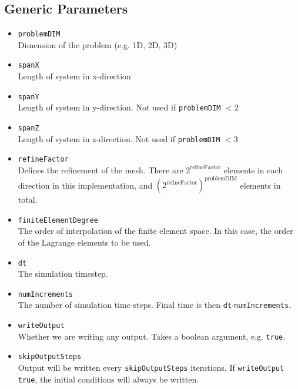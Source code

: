 \documentclass[11pt]{article}
\begin{document}
\subsection{Generic Parameters}
\begin{itemize}
\item \texttt{problemDIM} \\
	Dimension of the problem (e.g. 1D, 2D, 3D)
\item \texttt{spanX} \\
	Length of system in x-direction
\item \texttt{spanY} \\
	Length of system in y-direction.  Not used if \texttt{problemDIM} $< 2$
\item \texttt{spanZ} \\
	Length of system in z-direction.  Not used if \texttt{problemDIM} $< 3$
\item \texttt{refineFactor} \\
	Defines the refinement of the mesh.  There are $2^{\mathrm{refineFactor}}$ elements in each direction in this implementation, and 						$\left( 2^{\mathrm{refineFactor}} \right)^{\mathrm{problemDIM}}$ elements in total.
\item \texttt{finiteElementDegree} \\
	The order of interpolation of the finite element space.  In this case, the order of the Lagrange elements to be used.
\item \texttt{dt} \\
	The simulation timestep.
\item \texttt{numIncrements} \\
	The number of simulation time steps.  Final time is then \texttt{dt}$\cdot$\texttt{numIncrements}.
\item \texttt{writeOutput} \\
	Whether we are writing any output.  Takes a boolean argument, e.g. \texttt{true}.
\item \texttt{skipOutputSteps} \\
	Output will be written every \texttt{skipOutputSteps} iterations.  If \texttt{writeOutput} \texttt{true}, the initial conditions will always be written.
\end{itemize}

\end{document}
